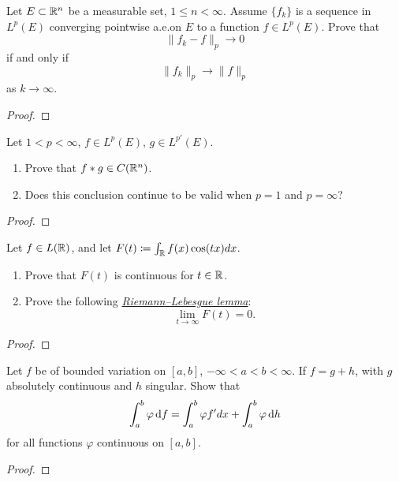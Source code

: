 \begin{problem}
Let $E\subset\mathbb{R}^n$ be a measurable set, $1\leq n<\infty$. Assume
$\{f_k\}$ is a sequence in $L^p(E)$ converging pointwise a.e.\@ on $E$ to a
function $f\in L^p(E)$. Prove that
\[
\|{f_k-f}\|_p\longrightarrow 0
\]
if and only if
\[
\|{f_k}\|_p\longrightarrow\|f\|_p
\]
as $k\to\infty$.
\end{problem}
\begin{proof}
\end{proof}

\begin{problem}
Let $1<p<\infty$, $f\in L^p(E)$, $g\in L^{p'}(E)$.
\begin{enumerate}[label=(\alph*),noitemsep]
\item Prove that $f*g\in C(\mathbb{R}^n)$.
\item Does this conclusion continue to be valid when $p=1$ and $p=\infty$?
\end{enumerate}
\end{problem}
\begin{proof}
\end{proof}

\begin{problem}
Let $f\in L(\mathbb{R})$, and let $F(t)\coloneqq\int_{\mathbb{R}}f(x)\cos(tx)dx$.
\begin{enumerate}[label=(\alph*),noitemsep]
\item Prove that $F(t)$ is continuous for $t\in\mathbb{R}$.
\item Prove the following
  \href{https://en.wikipedia.org/wiki/Riemann–Lebesgue_lemma}{\emph{Riemann--Lebesgue
      lemma}}:
\[
\lim_{t\to\infty}F(t)=0.
\]
\end{enumerate}
\end{problem}
\begin{proof}
\end{proof}

\begin{problem}
Let $f$ be of bounded variation on $[a,b]$, $-\infty<a<b<\infty$. If
$f=g+h$, with $g$ absolutely continuous and $h$ singular. Show that
\[
\int_a^b\varphi \mathop{}\!\mathrm{d} f=\int_a^b\varphi f'dx+\int_a^b\varphi \mathop{}\!\mathrm{d} h
\]
for all functions $\varphi$ continuous on $[a,b]$.
\end{problem}
\begin{proof}
\end{proof}

